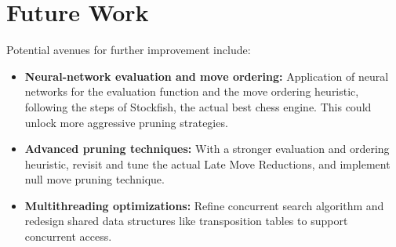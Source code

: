 \vspace{1em}

\newpage

\section*{Future Work}

\noindent
Potential avenues for further improvement include:

\begin{itemize}
    \item \textbf{Neural-network evaluation and move ordering:}  
    Application of neural networks for the evaluation function and the move ordering heuristic, following the steps of Stockfish, the actual best chess engine. This could unlock more aggressive pruning strategies.

    \item \textbf{Advanced pruning techniques:}  
    With a stronger evaluation and ordering heuristic, revisit and tune the actual Late Move Reductions, and implement null move pruning technique.

    \item \textbf{Multithreading optimizations:}  
    Refine concurrent search algorithm and redesign shared data structures like transposition tables to support concurrent access.
\end{itemize}